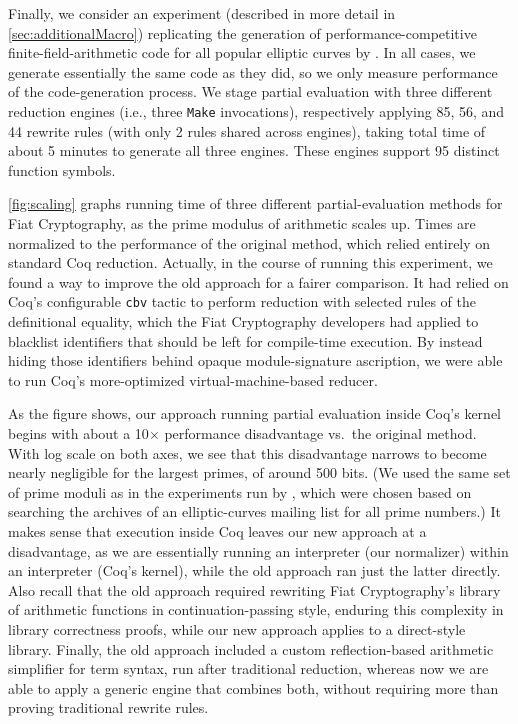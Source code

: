 Finally, we consider an experiment (described in more detail in \autoref{sec:additionalMacro}) replicating the generation of performance-competitive finite-field-arithmetic code for all popular elliptic curves by \textcite{FiatCryptoSP19}.
In all cases, we generate essentially the same code as they did, so we only measure performance of the code-generation process.
We stage partial evaluation with three different reduction engines (i.e., three \texttt{Make} invocations), respectively applying 85, 56, and 44 rewrite rules (with only 2 rules shared across engines), taking total time of about 5 minutes to generate all three engines.
These engines support 95 distinct function symbols.

\autoref{fig:scaling} graphs running time of three different partial-evaluation methods for Fiat Cryptography, as the prime modulus of arithmetic scales up.
Times are normalized to the performance of the original method, which relied entirely on standard Coq reduction.
Actually, in the course of running this experiment, we found a way to improve the old approach for a fairer comparison.
It had relied on Coq's configurable \texttt{cbv} tactic to perform reduction with selected rules of the definitional equality, which the Fiat Cryptography developers had applied to blacklist identifiers that should be left for compile-time execution.
By instead hiding those identifiers behind opaque module-signature ascription, we were able to run Coq's more-optimized virtual-machine-based reducer.

As the figure shows, our approach running partial evaluation inside Coq's kernel begins with about a 10$\times$ performance disadvantage vs.\ the original method.
With log scale on both axes, we see that this disadvantage narrows to become nearly negligible for the largest primes, of around 500 bits.
(We used the same set of prime moduli as in the experiments run by \textcite{FiatCryptoSP19}, which were chosen based on searching the archives of an elliptic-curves mailing list for all prime numbers.)
It makes sense that execution inside Coq leaves our new approach at a disadvantage, as we are essentially running an interpreter (our normalizer) within an interpreter (Coq's kernel), while the old approach ran just the latter directly.
Also recall that the old approach required rewriting Fiat Cryptography's library of arithmetic functions in continuation-passing style, enduring this complexity in library correctness proofs, while our new approach applies to a direct-style library.
Finally, the old approach included a custom reflection-based arithmetic simplifier for term syntax, run after traditional reduction, whereas now we are able to apply a generic engine that combines both, without requiring more than proving traditional rewrite rules.

